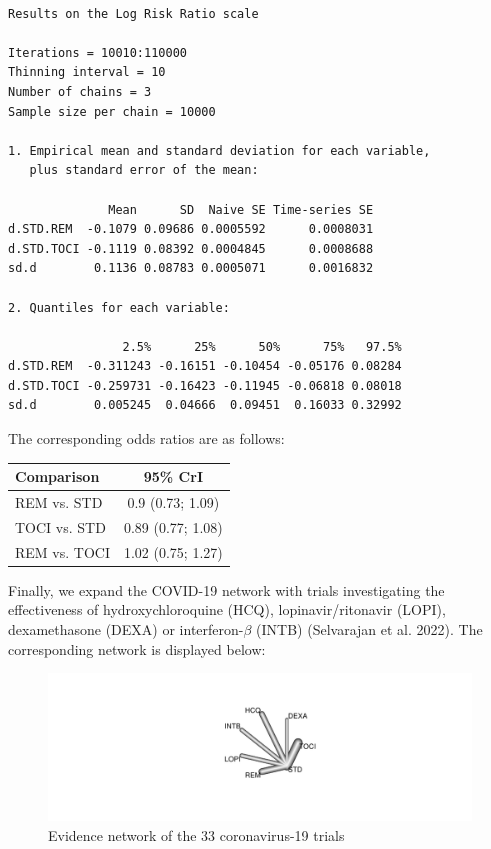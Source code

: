 \documentclass[
  letterpaper,
  DIV=11,
  numbers=noendperiod]{scrreprt}
\begin{document}
\begin{verbatim}

Results on the Log Risk Ratio scale

Iterations = 10010:110000
Thinning interval = 10 
Number of chains = 3 
Sample size per chain = 10000 

1. Empirical mean and standard deviation for each variable,
   plus standard error of the mean:

              Mean      SD  Naive SE Time-series SE
d.STD.REM  -0.1079 0.09686 0.0005592      0.0008031
d.STD.TOCI -0.1119 0.08392 0.0004845      0.0008688
sd.d        0.1136 0.08783 0.0005071      0.0016832

2. Quantiles for each variable:

                2.5%      25%      50%      75%   97.5%
d.STD.REM  -0.311243 -0.16151 -0.10454 -0.05176 0.08284
d.STD.TOCI -0.259731 -0.16423 -0.11945 -0.06818 0.08018
sd.d        0.005245  0.04666  0.09451  0.16033 0.32992
\end{verbatim}

The corresponding odds ratios are as follows:

\begin{longtable*}{lc}
\toprule
Comparison & 95\% CrI\\
\midrule
REM vs. STD & 0.9 (0.73; 1.09)\\
TOCI vs. STD & 0.89 (0.77; 1.08)\\
REM vs. TOCI & 1.02 (0.75; 1.27)\\
\bottomrule
\end{longtable*}

Finally, we expand the COVID-19 network with trials investigating the
effectiveness of hydroxychloroquine (HCQ), lopinavir/ritonavir (LOPI),
dexamethasone (DEXA) or interferon-\(\beta\) (INTB) (Selvarajan et al.
2022). The corresponding network is displayed below:

\begin{figure}

{\centering \includegraphics{chapter_10_files/figure-pdf/unnamed-chunk-18-1.pdf}

}

\caption{Evidence network of the 33 coronavirus-19 trials}

\end{figure}
\end{document}
